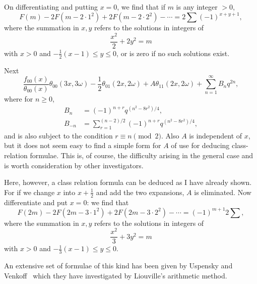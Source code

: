 \documentclass[12pt]{article}
\theoremstyle{remark}
\begin{document}
On differentiating and putting $x = 0$, we find that if $m$ is any integer $> 0$,
\begin{equation}\label{eq:class_relation_result1}
F(m) - 2F(m - 2 \cdot 1^2) + 2F(m - 2 \cdot 2^2) - \cdots = 2 \sum (-1)^{x+y+1},
\end{equation}
where the summation in $x, y$ refers to the solutions in integers of
\begin{equation}\label{eq:constraint1}
\frac{x^2}{2} + 2y^2 = m
\end{equation}
with $x > 0$ and $-\frac{1}{2}(x-1) \leq y \leq 0$, or is zero if no such solutions exist.

Next
\begin{equation}\label{eq:class_relation_example2}
\frac{f_{00}(x)}{\theta_{00}(x)} \theta_{00}(3x, 3\omega) - \frac{1}{2}\theta_{01}(2x, 2\omega) + A\theta_{11}(2x, 2\omega) + \sum_{n=1}^\infty B_n q^{2n},
\end{equation}
where for $n \geq 0$,
\begin{align}
B_n &= (-1)^{n+r} q^{(n^2-8r^2)/4}, \label{eq:B_n_new}\\
B_{-n} &= \sum_{r=1}^{(n-2)/2} (-1)^{n+r} q^{(n^2-8r^2)/4}, \label{eq:B_minus_n_new}
\end{align}
and is also subject to the condition $r \equiv n \pmod{2}$. Also $A$ is independent of $x$, but it does not seem easy to find a simple form for $A$ of use for deducing class-relation formulae. This is, of course, the difficulty arising in the general case and is worth consideration by other investigators.

Here, however, a class relation formula can be deduced as I have already shown. For if we change $x$ into $x + \frac{1}{2}$ and add the two expansions, $A$ is eliminated. Now differentiate and put $x = 0$: we find that
\begin{equation}\label{eq:class_relation_result2}
F(2m) - 2F(2m - 3 \cdot 1^2) + 2F(2m - 3 \cdot 2^2) - \cdots = (-1)^{m+1} 2 \sum,
\end{equation}
where the summation in $x, y$ refers to the solutions in integers of
\begin{equation}\label{eq:constraint2}
\frac{x^2}{3} + 3y^2 = m
\end{equation}
with $x > 0$ and $-\frac{1}{3}(x-1) \leq y \leq 0$.

An extensive set of formulae of this kind has been given by Uspensky and Venkoff~\cite{UspenskyVenkoff1924} which they have investigated by Liouville's arithmetic method.
\end{document}
